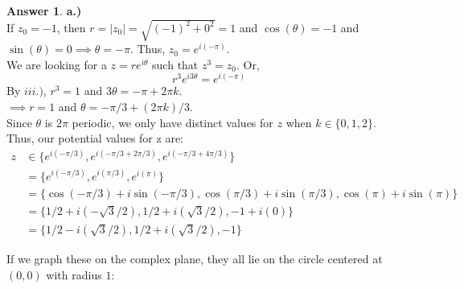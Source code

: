 \documentclass[10pt,a4paper]{article}
\theoremstyle{definition}
\newtheorem*{answer*}{Answer}
\begin{document}
\begin{answer*}{\textbf{a.)}}
\\If $z_0 = -1$, then $r = |z_0| = \sqrt{(-1)^2 + 0^2} = 1$ and $\cos(\theta) = -1$ and $\sin(\theta) = 0 \implies \theta = -\pi$. Thus, $z_0 = e^{i(-\pi)}$.
\\We are looking for a $z = re^{i\theta}$ such that $z^3 = z_0$. Or,
\[r^3e^{i3\theta} = e^{i(-\pi)}\]
By $iii.)$, $r^3 = 1$ and $3\theta = -\pi + 2\pi k$.
\\$\implies r = 1$ and $\theta = -\pi/3 + (2\pi k)/3$.
\\Since $\theta$ is $2\pi$ periodic, we only have distinct values for $z$ when $k \in \{0,1,2\}$.
\\Thus, our potential values for z are:
\begin{align*}
z &\in \{e^{i(-\pi/3)}, e^{i(-\pi/3 + 2\pi/3)}, e^{i(-\pi/3 + 4\pi/3)}\}\\
&= \{e^{i(-\pi/3)}, e^{i(\pi/3)}, e^{i(\pi)}\}\\
&= \{\cos(-\pi/3) + i\sin(-\pi/3), \cos(\pi/3) + i\sin(\pi/3), \cos(\pi) + i\sin(\pi)\}\\
&= \{1/2 + i(-\sqrt{3}/2), 1/2 + i(\sqrt{3}/2), -1 + i(0)\}\\
&= \boxed{\{1/2 - i(\sqrt{3}/2), 1/2 + i(\sqrt{3}/2), -1\}}
\end{align*}

If we graph these on the complex plane, they all lie on the circle centered at $(0,0)$ with radius $1$:

\end{answer*}
\end{document}

